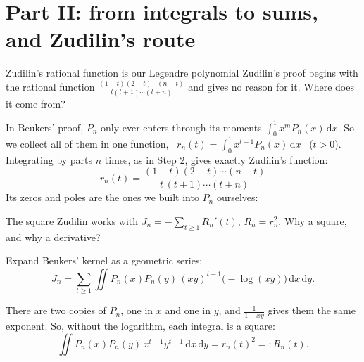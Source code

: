 \documentclass[aspectratio=169,11pt]{beamer}
\newcommand{\dd}{\,\mathrm{d}}
\begin{document}
\section{Part II: from integrals to sums, and Zudilin's route}

\begin{frame}{Zudilin's rational function is our Legendre polynomial}
  Zudilin's proof begins with the rational function
  $\frac{(1-t)(2-t)\cdots(n-t)}{t(t+1)\cdots(t+n)}$ and gives no reason for it. Where does it come from?

  In Beukers' proof, $P_n$ only ever enters through its moments $\int_0^1x^mP_n(x)\dd x$. So we
  collect all of them in one function, \ $r_n(t)=\int_0^1x^{t-1}P_n(x)\dd x$ \ ($t>0$).
  \pause
  Integrating by parts $n$ times, as in Step 2, gives exactly Zudilin's function:
  \[
    \boxed{\;r_n(t)=\frac{(1-t)(2-t)\cdots(n-t)}{t\,(t+1)\cdots(t+n)}\;}
  \]
  \pause
  Its zeros and poles are the ones we built into $P_n$ ourselves:
  \centering
\end{frame}

\begin{frame}{The square}
  Zudilin works with $J_n=-\sum_{t\ge1}R_n'(t)$, $R_n=r_n^2$. Why a square, and why a derivative?

  \medskip
  Expand Beukers' kernel as a geometric series:
  \[
    J_n=\sum_{t\ge1}\iint P_n(x)P_n(y)\,(xy)^{t-1}\bigl(-\log(xy)\bigr)\dd x\dd y .
  \]

  \pause
  There are two copies of $P_n$, one in $x$ and one in $y$, and $\frac1{1-xy}$ gives them the same
  exponent. So, without the logarithm, each integral is a square:
  \[
    \iint P_n(x)P_n(y)\,x^{t-1}y^{t-1}\dd x\dd y=r_n(t)^2=:R_n(t).
  \]
\end{frame}
\end{document}
